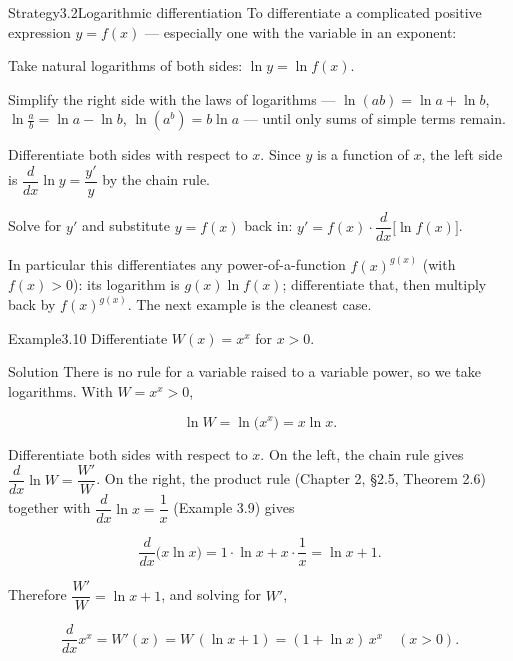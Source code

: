 \begin{hkstrategy}{Strategy}{3.2}{Logarithmic differentiation}
To differentiate a complicated positive expression \(y = f(x)\) — especially one with the variable in an exponent:

\begin{hksteps}
  \item Take natural logarithms of both sides: \(\ln y = \ln f(x)\).
  \item Simplify the right side with the laws of logarithms — \(\ln(ab) = \ln a + \ln b\), \(\ln\frac{a}{b} = \ln a - \ln b\), \(\ln(a^{b}) = b\ln a\) — until only sums of simple terms remain.
  \item Differentiate both sides with respect to \(x\). Since \(y\) is a function of \(x\), the left side is \(\dfrac{d}{dx}\ln y = \dfrac{y'}{y}\) by the chain rule.
  \item Solve for \(y'\) and substitute \(y = f(x)\) back in: \(y' = f(x)\cdot\dfrac{d}{dx}\bigl[\ln f(x)\bigr]\).
\end{hksteps}
In particular this differentiates any power-of-a-function \(f(x)^{g(x)}\) (with \(f(x) > 0\)): its logarithm is \(g(x)\ln f(x)\); differentiate that, then multiply back by \(f(x)^{g(x)}\). The next example is the cleanest case.
\end{hkstrategy}
\begin{hkworkedexample}
\begin{hkexample}{Example}{3.10}{}
Differentiate \(W(x) = x^{x}\) for \(x > 0\).
\end{hkexample}
\begin{hksolution}{Solution}{}{}
There is no rule for a variable raised to a variable power, so we take logarithms. With \(W = x^{x} > 0\),

\[ \ln W = \ln\bigl(x^{x}\bigr) = x\ln x. \]

Differentiate both sides with respect to \(x\). On the left, the chain rule gives \(\dfrac{d}{dx}\ln W = \dfrac{W'}{W}\). On the right, the product rule (Chapter 2, §2.5, Theorem 2.6) together with \(\dfrac{d}{dx}\ln x = \dfrac{1}{x}\) (Example 3.9) gives

\[ \frac{d}{dx}\bigl(x\ln x\bigr) = 1\cdot\ln x + x\cdot\frac{1}{x} = \ln x + 1. \]

Therefore \(\dfrac{W'}{W} = \ln x + 1\), and solving for \(W'\),

\[ \frac{d}{dx}x^{x} = W'(x) = W\,(\ln x + 1) = (1 + \ln x)\,x^{x} \quad (x > 0). \]
\end{hksolution}
\end{hkworkedexample}
